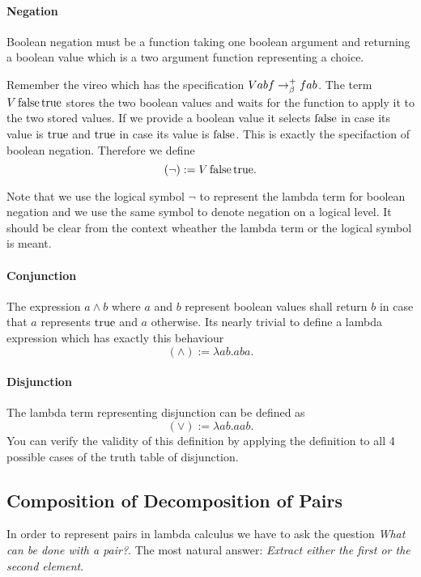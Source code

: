 \paragraph{Negation}

Boolean negation must be a function taking one boolean argument and returning
a boolean value which is a two argument function representing a choice.

Remember the vireo which has the specification $V a b f \to^+_\beta f a
b$. The term $V\, \text{false}\, \text{true}$ stores the two boolean values and waits for the
function to apply it to the two stored values. If we provide a boolean value
it selects $\text{false}$ in case its value is $\text{true}$ and $\text{true}$ in case its value
is $\text{false}$. This is exactly the specifaction of boolean negation. Therefore
we define
$$ (\lnot) := V\, \text{false}\, \text{true}.$$

Note that we use the logical symbol $\lnot$ to represent the lambda term for
boolean negation and we use the same symbol to denote negation on a logical
level. It should be clear from the context wheather the lambda term or the
logical symbol is meant.


\paragraph{Conjunction} The expression $a \land b$ where $a$ and $b$ represent
boolean values shall return $b$ in case that $a$ represents $\text{true}$ and $a$
otherwise. Its nearly trivial to define a lambda expression which has exactly
this behaviour
$$ (\land) := \lambda a b. a b a.$$

\paragraph{Disjunction} The lambda term representing disjunction can be
defined as
$$ (\lor) := \lambda a b. a a b.$$
You can verify the validity of this definition by applying the definition to
all 4 possible cases of the truth table of disjunction.




\subsection{Composition of Decomposition of Pairs}

In order to represent pairs in lambda calculus we have to ask the question
\emph{What can be done with a pair?}. The most natural answer: \emph{Extract
  either the first or the second element}.

